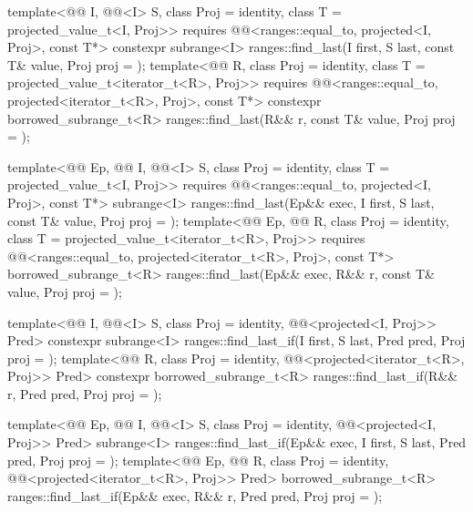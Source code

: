 %
\begin{itemdecl}
template<@@ I, @@<I> S, class Proj = identity,
         class T = projected_value_t<I, Proj>>
  requires @@<ranges::equal_to, projected<I, Proj>, const T*>
  constexpr subrange<I> ranges::find_last(I first, S last, const T& value, Proj proj = {});
template<@@ R, class Proj = identity,
         class T = projected_value_t<iterator_t<R>, Proj>>
  requires @@<ranges::equal_to, projected<iterator_t<R>, Proj>, const T*>
  constexpr borrowed_subrange_t<R> ranges::find_last(R&& r, const T& value, Proj proj = {});

template<@@ Ep, @@ I, @@<I> S,
         class Proj = identity, class T = projected_value_t<I, Proj>>
  requires @@<ranges::equal_to, projected<I, Proj>, const T*>
  subrange<I> ranges::find_last(Ep&& exec, I first, S last, const T& value, Proj proj = {});
template<@@ Ep, @@ R, class Proj = identity,
         class T = projected_value_t<iterator_t<R>, Proj>>
  requires
    @@<ranges::equal_to, projected<iterator_t<R>, Proj>, const T*>
  borrowed_subrange_t<R> ranges::find_last(Ep&& exec, R&& r, const T& value, Proj proj = {});

template<@@ I, @@<I> S, class Proj = identity,
         @@<projected<I, Proj>> Pred>
  constexpr subrange<I> ranges::find_last_if(I first, S last, Pred pred, Proj proj = {});
template<@@ R, class Proj = identity,
         @@<projected<iterator_t<R>, Proj>> Pred>
  constexpr borrowed_subrange_t<R> ranges::find_last_if(R&& r, Pred pred, Proj proj = {});

template<@@ Ep, @@ I, @@<I> S,
         class Proj = identity, @@<projected<I, Proj>> Pred>
  subrange<I> ranges::find_last_if(Ep&& exec, I first, S last, Pred pred, Proj proj = {});
template<@@ Ep, @@ R,
         class Proj = identity,
         @@<projected<iterator_t<R>, Proj>> Pred>
  borrowed_subrange_t<R> ranges::find_last_if(Ep&& exec, R&& r, Pred pred, Proj proj = {});


\end{itemdecl}
